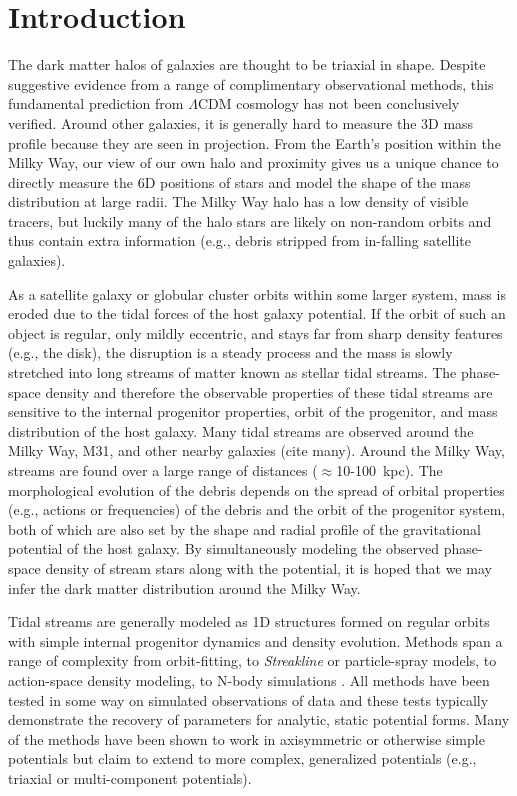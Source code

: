 \documentclass[letterpaper,12pt,preprint]{aastex}
\begin{document}
\keywords{
}

\section{Introduction}\label{sec:introduction}

The dark matter halos of galaxies are thought to be triaxial in shape. Despite suggestive evidence from a range of complimentary observational methods, this fundamental prediction from $\Lambda$CDM cosmology has not been conclusively verified. Around other galaxies, it is generally hard to measure the 3D mass profile because they are seen in projection. From the Earth's position within the Milky Way, our view of our own halo and proximity gives us a unique chance to directly measure the 6D positions of stars and model the shape of the mass distribution at large radii. The Milky Way halo has a low density of visible tracers, but luckily many of the halo stars are likely on non-random orbits and thus contain extra information (e.g., debris stripped from in-falling satellite galaxies).

As a satellite galaxy or globular cluster orbits within some larger system, mass is eroded due to the tidal forces of the host galaxy potential. If the orbit of such an object is regular, only mildly eccentric, and stays far from sharp density features (e.g., the disk), the disruption is a steady process and the mass is slowly stretched into long streams of matter known as stellar tidal streams. The phase-space density and therefore the observable properties of these tidal streams are sensitive to the internal progenitor properties, orbit of the progenitor, and mass distribution of the host galaxy. Many tidal streams are observed around the Milky Way, M31, and other nearby galaxies (cite many). Around the Milky Way, streams are found over a large range of distances ($\approx$10-100~kpc). The morphological evolution of the debris depends on the spread of orbital properties (e.g., actions or frequencies) of the debris and the orbit of the progenitor system, both of which are also set by the shape and radial profile of the gravitational potential of the host galaxy. By simultaneously modeling the observed phase-space density of stream stars along with the potential, it is hoped that we may infer the dark matter distribution around the Milky Way.

Tidal streams are generally modeled as 1D structures formed on regular orbits with simple internal progenitor dynamics and density evolution. Methods span a range of complexity from orbit-fitting, to \emph{Streakline} or particle-spray models, to action-space density modeling, to N-body simulations \citep[see, e.g., the introduction of][]{kuepper15}. All methods have been tested in some way on simulated observations of data and these tests typically demonstrate the recovery of parameters for analytic, static potential forms. Many of the methods have been shown to work in axisymmetric or otherwise simple potentials but claim to extend to more complex, generalized potentials (e.g., triaxial or multi-component potentials). 
\end{document}
